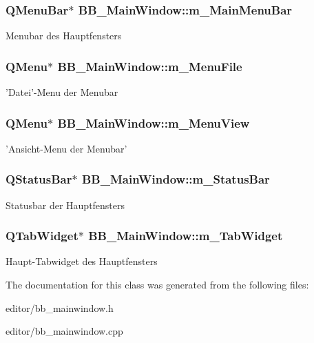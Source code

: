 \subsubsection{\setlength{\rightskip}{0pt plus 5cm}QMenu\-Bar$\ast$ {\bf BB\_\-Main\-Window::m\_\-Main\-Menu\-Bar}\hspace{0.3cm}{\tt  [protected]}}\label{classBB__MainWindow_p0}


Menubar des Hauptfensters 
\subsubsection{\setlength{\rightskip}{0pt plus 5cm}QMenu$\ast$ {\bf BB\_\-Main\-Window::m\_\-Menu\-File}\hspace{0.3cm}{\tt  [protected]}}\label{classBB__MainWindow_p1}


'Datei'-Menu der Menubar 
\subsubsection{\setlength{\rightskip}{0pt plus 5cm}QMenu$\ast$ {\bf BB\_\-Main\-Window::m\_\-Menu\-View}\hspace{0.3cm}{\tt  [protected]}}\label{classBB__MainWindow_p2}


'Ansicht-Menu der Menubar' 
\subsubsection{\setlength{\rightskip}{0pt plus 5cm}QStatus\-Bar$\ast$ {\bf BB\_\-Main\-Window::m\_\-Status\-Bar}\hspace{0.3cm}{\tt  [protected]}}\label{classBB__MainWindow_p3}


Statusbar der Hauptfensters 
\subsubsection{\setlength{\rightskip}{0pt plus 5cm}QTab\-Widget$\ast$ {\bf BB\_\-Main\-Window::m\_\-Tab\-Widget}\hspace{0.3cm}{\tt  [protected]}}\label{classBB__MainWindow_p4}


Haupt-Tabwidget des Hauptfensters 

The documentation for this class was generated from the following files:\begin{CompactItemize}
\item 
editor/bb\_\-mainwindow.h\item 
editor/bb\_\-mainwindow.cpp\end{CompactItemize}
